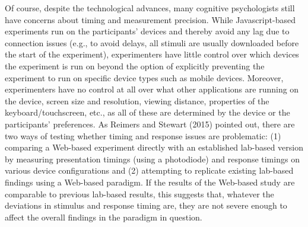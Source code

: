 \documentclass[
  english,
  man,floatsintext]{apa6}
\begin{document}
Of course, despite the technological advances, many cognitive psychologists still have concerns about timing and measurement precision. While Javascript-based experiments run on the participants' devices and thereby avoid any lag due to connection issues (e.g., to avoid delays, all stimuli are usually downloaded before the start of the experiment), experimenters have little control over which devices the experiment is run on beyond the option of explicitly preventing the experiment to run on specific device types such as mobile devices. Moreover, experimenters have no control at all over what other applications are running on the device, screen size and resolution, viewing distance, properties of the keyboard/touchscreen, etc., as all of these are determined by the device or the participants' preferences. As Reimers and Stewart (2015) pointed out, there are two ways of testing whether timing and response issues are problematic: (1) comparing a Web-based experiment directly with an established lab-based version by measuring presentation timings (using a photodiode) and response timings on various device configurations and (2) attempting to replicate existing lab-based findings using a Web-based paradigm. If the results of the Web-based study are comparable to previous lab-based results, this suggests that, whatever the deviations in stimulus and response timing are, they are not severe enough to affect the overall findings in the paradigm in question.
\end{document}
